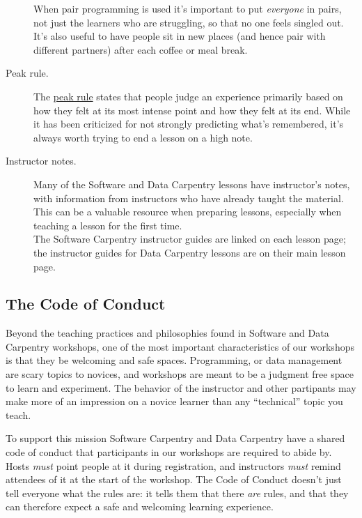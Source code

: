\begin{description}
When pair programming is used it's important to put \emph{everyone} in
pairs, not just the learners who are struggling, so that no one feels
singled out. It's also useful to have people sit in new places (and
hence pair with different partners) after each coffee or meal break.
\item[Peak rule.]
The \href{https://en.wikipedia.org/wiki/Peak\%E2\%80\%93end\_rule}{peak
rule} states that people judge an experience primarily based on how they
felt at its most intense point and how they felt at its end. While it
has been criticized for not strongly predicting what's remembered, it's
always worth trying to end a lesson on a high note.
\item[Instructor notes.]
Many of the Software and Data Carpentry lessons have instructor's notes,
with information from instructors who have already taught the material.
This can be a valuable resource when preparing lessons, especially when
teaching a lesson for the first time.\\The Software Carpentry instructor
guides are linked on each lesson page; the instructor guides for Data
Carpentry lessons are on their
main lesson page.
\end{description}

\subsection{The Code of Conduct}\label{the-code-of-conduct}

Beyond the teaching practices and philosophies found in Software and
Data Carpentry workshops, one of the most important characteristics of
our workshops is that they be welcoming and safe spaces. Programming, or
data management are scary topics to novices, and workshops are meant to
be a judgment free space to learn and experiment. The behavior of the
instructor and other partipants may make more of an impression on a
novice learner than any ``technical'' topic you teach.

To support this mission Software Carpentry and Data Carpentry have a
shared code of conduct that
participants in our workshops are required to abide by. Hosts
\emph{must} point people at it during registration, and instructors
\emph{must} remind attendees of it at the start of the workshop. The
Code of Conduct doesn't just tell everyone what the rules are: it tells
them that there \emph{are} rules, and that they can therefore expect a
safe and welcoming learning experience.

